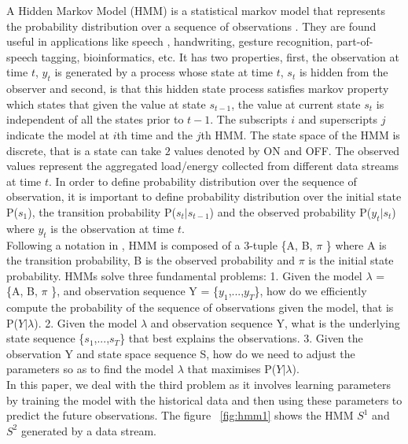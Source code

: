 \documentclass[conference]{IEEEtran}
\begin{document}
A Hidden Markov Model (HMM) is a statistical markov model that represents the probability distribution over a sequence of observations \cite{Ghahramani}. They are found useful in applications like speech \cite{Rabiner}, handwriting, gesture recognition, part-of-speech tagging, bioinformatics, etc. It has two properties, first, the observation at time $t$, $y_{t}$ is generated by a process whose state at time $t$, $s_{t}$ is hidden from the observer and second, is that this hidden state process satisfies markov property which states that given the value at state $s_{t-1}$, the value at current state $s_{t}$ is independent of all the states prior to $t-1$. The subscripts $i$ and superscripts $j$ indicate the model at $i$th time and the $j$th HMM. The state space of the HMM is discrete, that is a state can take $2$ values denoted by ON and OFF. The observed values represent the aggregated load/energy collected from different data streams at time $t$. In order to define probability distribution over the sequence of observation, it is important to define probability distribution over the initial state P($s_{1}$), the transition probability P($s_{t}|s_{t-1}$) and the observed probability P($y_{t}|s_{t}$) where $y_{t}$ is the observation at time $t$. \\
Following a notation in \cite{Rabiner}, HMM is composed of a 3-tuple \{A, B, $\pi$ \} where A is the transition probability, B is the observed probability and $\pi$ is the initial state probability.
HMMs solve three fundamental problems:
1. Given the model $\lambda$ = \{A, B, $\pi$ \}, and observation sequence Y = \{$y_{1}$,...,$y_{T}$\}, how do we efficiently compute the probability of the sequence of observations given the model, that is P($Y|\lambda$).
2. Given the model $\lambda$ and observation sequence Y, what is the underlying state sequence \{$s_{1}$,...,$s_{T}$\} that best explains the observations.
3. Given the observation Y and state space sequence S, how do we need to adjust the parameters so as to find the model $\lambda$ that maximises P($Y|\lambda$).\\
In this paper, we deal with the third problem as it involves learning parameters by training the model with the historical data and then using these parameters to predict the future observations.
The figure ~\ref{fig:hmm1} shows the HMM $S^1$ and $S^2$ generated by a data stream.
\end{document}
